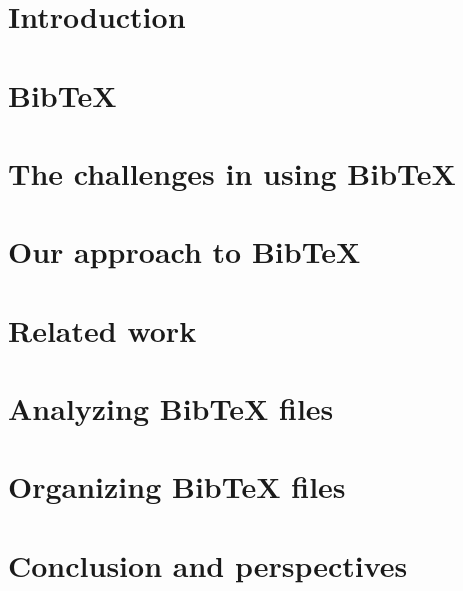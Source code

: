 \documentclass[twoside,11pt,openright,a4paper]{report}
\newcommand{\bibtex}{Bib{\TeX}}
\begin{document}

\chapter{Introduction}
\label{ch:intro}


\chapter{{\bibtex}}
\label{ch:about}


\chapter{The challenges in using {\bibtex}}
\label{ch:problem-description}


\chapter{Our approach to {\bibtex}}
\label{ch:approach}


\chapter{Related work}
\label{ch:related}


\chapter{Analyzing {\bibtex} files}
\label{ch:analyzing}


\chapter{Organizing {\bibtex} files}
\label{ch:organizing}


\chapter{Conclusion and perspectives}
\label{ch:conclusion}


\printbibliography{}
\end{document}
